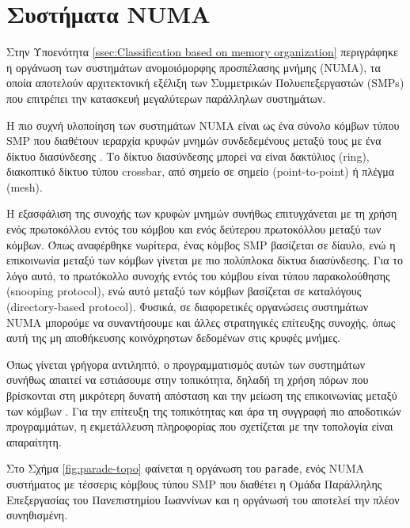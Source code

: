 \section{Συστήματα NUMA}
\label{sec:NUMA Systems}
Στην Υποενότητα \ref{ssec:Classification based on memory organization} περιγράφηκε η οργάνωση των συστημάτων ανομοιόμορφης προσπέλασης μνήμης (NUMA), τα οποία αποτελούν αρχιτεκτονική εξέλιξη των Συμμετρικών Πολυεπεξεργαστών (SMPs) που επιτρέπει την κατασκευή μεγαλύτερων παράλληλων συστημάτων.

Η πιο συχνή υλοποίηση των συστημάτων NUMA είναι ως ένα σύνολο κόμβων τύπου SMP που διαθέτουν ιεραρχία κρυφών μνημών συνδεδεμένους μεταξύ τους με ένα δίκτυο διασύνδεσης \cite{dobson2003linux}. Το δίκτυο διασύνδεσης μπορεί να είναι δακτύλιος (ring), διακοπτικό δίκτυο τύπου crossbar, από σημείο σε σημείο (point-to-point) ή πλέγμα (mesh).

Η εξασφάλιση της συνοχής των κρυφών μνημών συνήθως επιτυγχάνεται με τη χρήση ενός πρωτοκόλλου εντός του κόμβου και ενός δεύτερου πρωτοκόλλου μεταξύ των κόμβων. Όπως αναφέρθηκε νωρίτερα, ένας κόμβος SMP βασίζεται σε δίαυλο, ενώ η επικοινωνία μεταξύ των κόμβων γίνεται με πιο πολύπλοκα δίκτυα διασύνδεσης. Για το λόγο αυτό, το πρωτόκολλο συνοχής εντός του κόμβου είναι τύπου παρακολούθησης (snooping protocol), ενώ αυτό μεταξύ των κόμβων βασίζεται σε καταλόγους (directory-based protocol). Φυσικά, σε διαφορετικές οργανώσεις συστημάτων NUMA μπορούμε να συναντήσουμε και άλλες στρατηγικές επίτευξης συνοχής, όπως αυτή της μη αποθήκευσης κοινόχρηστων δεδομένων στις κρυφές μνήμες.

Όπως γίνεται γρήγορα αντιληπτό, ο προγραμματισμός αυτών των συστημάτων συνήθως απαιτεί να εστιάσουμε στην τοπικότητα, δηλαδή τη χρήση πόρων που βρίσκονται στη μικρότερη δυνατή απόσταση και την μείωση της επικοινωνίας μεταξύ των κόμβων \cite{bligh2004linux}. Για την επίτευξη της τοπικότητας και άρα τη συγγραφή πιο αποδοτικών προγραμμάτων, η εκμετάλλευση πληροφορίας που σχετίζεται με την τοπολογία είναι απαραίτητη.

Στο Σχήμα \ref{fig:parade-topo} φαίνεται η οργάνωση του \texttt{parade}, ενός NUMA συστήματος με τέσσερις κόμβους τύπου SMP που διαθέτει η Ομάδα Παράλληλης Επεξεργασίας του Πανεπιστημίου Ιωαννίνων και η οργάνωσή του αποτελεί την πλέον συνηθισμένη.

